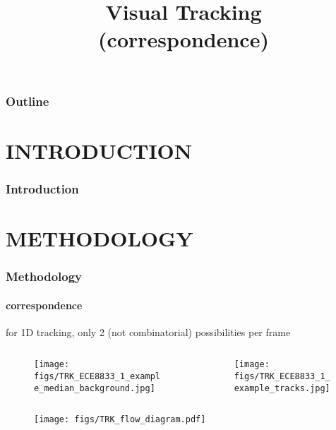 
\title{Visual Tracking \\ (correspondence)}
\begin{frame}[plain]\logoTechTower
	\titlepage
\end{frame}

\begin{frame}
\frametitle{Outline}
\logoCSIPCPL\logoTechTower
	\setcounter{tocdepth}{1}	
	\tableofcontents
\end{frame}

\section{INTRODUCTION}
\begin{frame}
\frametitle{Introduction}
\framesubtitle{}
\logoCSIPCPL\mypagenum
\end{frame}



\section{METHODOLOGY}
\begin{frame}
\frametitle{Methodology}
\framesubtitle{correspondence}
\mypagenum
	for 1D tracking, only 2 (not combinatorial) possibilities per frame
	\begin{columns}
		\begin{column}{1.5in}
			\begin{figure}
				\texttt{[image: figs/TRK\_ECE8833\_1\_example\_median\_background.jpg]}
			\end{figure}
		\end{column}
		\begin{column}{1.5in}
			\begin{figure}
				\texttt{[image: figs/TRK\_ECE8833\_1\_example\_tracks.jpg]}
			\end{figure}
		\end{column}
	\end{columns}
	\begin{figure}
		\texttt{[image: figs/TRK\_flow\_diagram.pdf]}
	\end{figure}
\end{frame}



